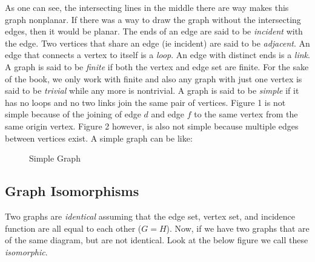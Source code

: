 \documentclass{article}
\begin{document}
\indent{} As one can see, the intersecting lines in the middle there are way makes this graph nonplanar. If there was a way to draw the graph without the intersecting edges, then it would be planar.
\newline
\indent{} The ends of an edge are said to be \emph{incident} with the edge. Two vertices that share an edge (ie incident) are said to be \emph{adjacent}. An edge that connects a vertex to itself is a \emph{loop}. An edge with distinct ends is a \emph{link}.
\newline
\indent{} A graph is said to be \emph{finite} if both the vertex and edge set are finite. For the sake of the book, we only work with finite and also any graph with just one vertex is said to be \emph{trivial} while any more is nontrivial.
\newline
\indent{} A graph is said to be \emph{simple} if it has no loops and no two links join the same pair of vertices. Figure 1 is not simple because of the joining of edge $d$ and edge $f$ to the same vertex from the same origin vertex.
Figure 2 however, is also not simple because multiple edges between vertices exist. A simple graph can be like:
\begin{figure}[ht]
    \centering
    \caption{Simple Graph}
\end{figure}
\newline

\subsection{Graph Isomorphisms}
\indent{} Two graphs are \emph{identical} assuming that the edge set, vertex set, and incidence function are all equal to each other ($G=H$). Now, if we have two graphs that are of the same diagram, but are not identical. Look at the below figure we call these \emph{isomorphic}.
\end{document}
